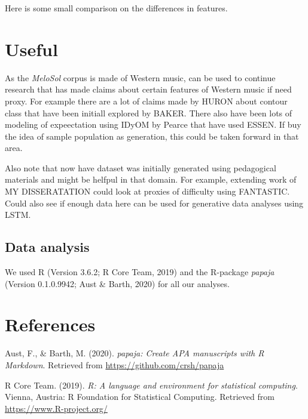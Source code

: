 \documentclass[english,man]{apa6}
\begin{document}
Here is some small comparison on the differences in features.

\hypertarget{useful}{%
\section{Useful}\label{useful}}

As the \emph{MeloSol} corpus is made of Western music, can be used to continue research that has made claims about certain features of Western music if need proxy.
For example there are a lot of claims made by HURON about contour class that have been initiall explored by BAKER.
There also have been lots of modeling of expeectation using IDyOM by Pearce that have used ESSEN.
If buy the idea of sample population as generation, this could be taken forward in that area.

Also note that now have dataset was initially generated using pedagogical materials and might be helfpul in that domain.
For example, extending work of MY DISSERATATION could look at proxies of difficulty using FANTASTIC.
Could also see if enough data here can be used for generative data analyses using LSTM.

\hypertarget{data-analysis}{%
\subsection{Data analysis}\label{data-analysis}}

We used R (Version 3.6.2; R Core Team, 2019) and the R-package \emph{papaja} (Version 0.1.0.9942; Aust \& Barth, 2020) for all our analyses.

\newpage

\hypertarget{references}{%
\section{References}\label{references}}

\begingroup
\setlength{\parindent}{-0.5in}
\setlength{\leftskip}{0.5in}

\hypertarget{refs}{}
\leavevmode\hypertarget{ref-R-papaja}{}%
Aust, F., \& Barth, M. (2020). \emph{papaja: Create APA manuscripts with R Markdown}. Retrieved from \url{https://github.com/crsh/papaja}

\leavevmode\hypertarget{ref-R-base}{}%
R Core Team. (2019). \emph{R: A language and environment for statistical computing}. Vienna, Austria: R Foundation for Statistical Computing. Retrieved from \url{https://www.R-project.org/}

\endgroup
\end{document}
